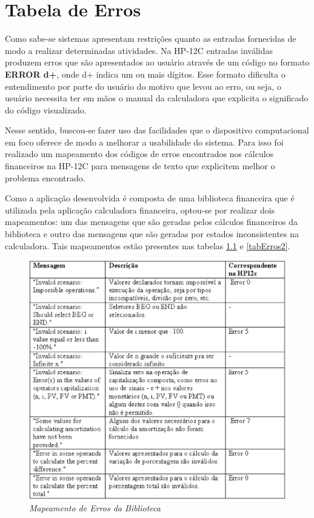 \chapter{Tabela de Erros} \label{tabelaErros}

Como sabe-se sistemas apresentam restrições quanto as entradas fornecidas de modo a realizar determinadas atividades. Na HP-12C entradas inválidas produzem erros que são a\-presentados ao usuário através de um código no formato \textbf{ERROR d+}, onde d+ indica um ou mais dígitos. Esse formato dificulta o entendimento por parte do usuário do motivo que levou ao erro, ou seja, o usuário necessita ter em mãos o manual da calculadora que explicita o significado do código visualizado.

Nesse sentido, buscou-se fazer uso das facilidades que o dispositivo computacional em foco oferece de modo a melhorar a usabilidade do sistema. Para isso foi realizado um mapeamento dos códigos de erros encontrados nos cálculos financeiros na HP-12C para mensagens de texto que explicitem melhor o problema encontrado. 

Como a aplicação desenvolvida é composta de uma biblioteca financeira que é utilizada pela aplicação calculadora financeira, optou-se por realizar dois mapeamentos: um das mensagens que são geradas pelos cálculos financeiros da biblioteca e outro das mensagens que são geradas por estados inconsistentes na calculadora. Tais mapeamentos estão presentes nas tabelas \ref{tabErros1} e \ref{tabErros2}.

\begin{figure}[!h]
\includegraphics[scale = .7]{tabErro1.eps}
\caption{\it Mapeamento de Erros da Biblioteca}
\label{tabErros1} 
\end{figure}

